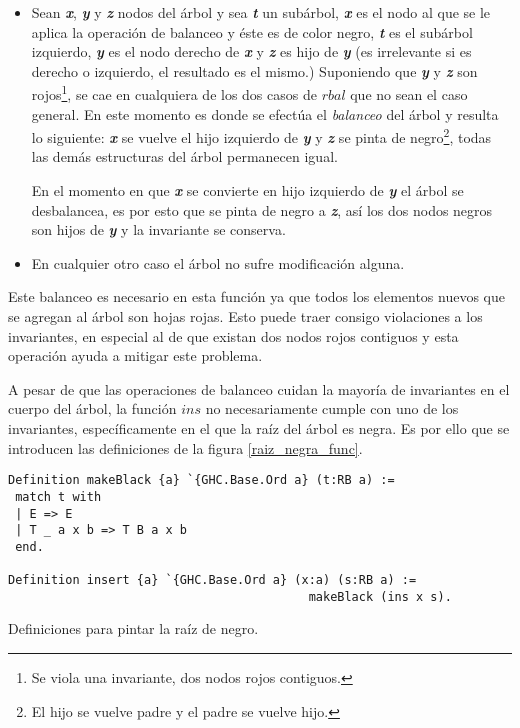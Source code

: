 \begin{itemize}
    \item Sean \textbf{\textit{x}}, \textbf{\textit{y}} y \textbf{\textit{z}} nodos del \'arbol y 
    sea \textbf{\textit{t}} un subárbol, \textbf{\textit{x}} es el nodo al que se le aplica la 
    operaci\'on de balanceo y \'este es de color negro, \textbf{\textit{t}} es el subárbol izquierdo,
    \textbf{\textit{y}} es el nodo derecho de \textbf{\textit{x}} y \textbf{\textit{z}} es hijo de
    \textbf{\textit{y}} (es irrelevante si es derecho o izquierdo, el resultado es el mismo.) 
    Suponiendo que \textbf{\textit{y}} y \textbf{\textit{z}} son rojos\footnote{Se viola una 
    invariante, dos nodos rojos contiguos.}, se cae en cualquiera de los dos casos de
    \hyperref[func_balanceo]{$rbal$} que no sean el caso general. En este momento es donde se 
    efectúa el \textit{balanceo} del árbol y resulta lo siguiente: \textbf{\textit{x}} se vuelve el 
    hijo izquierdo de \textbf{\textit{y}} y \textbf{\textit{z}} se pinta de negro\footnote{El hijo 
    se vuelve padre y el padre se vuelve hijo.}, todas las dem\'as estructuras del \'arbol 
    permanecen igual.

    En el momento en que \textbf{\textit{x}} se convierte en hijo izquierdo de \textbf{\textit{y}}
    el \'arbol se desbalancea, es por esto que se pinta de negro a \textbf{\textit{z}}, así los dos
    nodos negros son hijos de \textbf{\textit{y}} y la invariante se conserva.
    \item En cualquier otro caso el \'arbol no sufre modificaci\'on alguna.
\end{itemize}

Este balanceo es necesario en esta funci\'on ya que todos los elementos nuevos que se agregan al 
\'arbol son hojas rojas. Esto puede traer consigo violaciones a los invariantes, en especial al de
que existan dos nodos rojos contiguos y esta operaci\'on ayuda a mitigar este problema.

A pesar de que las operaciones de balanceo cuidan la mayoría de invariantes en el cuerpo del 
\'arbol, la función \hyperref[func_ins]{$ins$} no necesariamente cumple con uno de los invariantes, 
espec\'ificamente en el que la raíz del árbol es negra. Es por ello que se introducen las 
definiciones de la figura 
\ref{raiz_negra_func}.

\begin{listing}[!ht]
\centering
\captionsetup{justification=centering}
\begin{verbatim}
Definition makeBlack {a} `{GHC.Base.Ord a} (t:RB a) :=
 match t with
 | E => E
 | T _ a x b => T B a x b
 end.

Definition insert {a} `{GHC.Base.Ord a} (x:a) (s:RB a) :=
                                          makeBlack (ins x s).
\end{verbatim}
\caption{Definiciones para pintar la ra\'iz de negro.}
\label{raiz_negra_func}
\end{listing}

